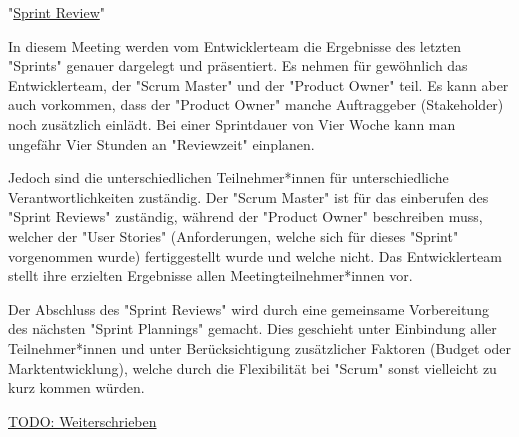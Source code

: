 "\underline{Sprint Review}"

In diesem Meeting werden vom Entwicklerteam die Ergebnisse des letzten "Sprints" genauer dargelegt und präsentiert. Es nehmen für gewöhnlich das Entwicklerteam, der "Scrum Master" und der "Product Owner" teil. Es kann aber auch vorkommen, dass der "Product Owner" manche Auftraggeber (Stakeholder) noch zusätzlich einlädt. Bei einer Sprintdauer von Vier Woche kann man ungefähr Vier Stunden an "Reviewzeit" einplanen.

Jedoch sind die unterschiedlichen Teilnehmer*innen für unterschiedliche Verantwortlichkeiten zuständig. Der "Scrum Master" ist für das einberufen des "Sprint Reviews" zuständig, während der "Product Owner" beschreiben muss, welcher der "User Stories" (Anforderungen, welche sich für dieses "Sprint" vorgenommen wurde) fertiggestellt wurde und welche nicht. Das Entwicklerteam stellt ihre erzielten Ergebnisse allen Meetingteilnehmer*innen vor.

Der Abschluss des "Sprint Reviews" wird durch eine gemeinsame Vorbereitung des nächsten "Sprint Plannings" gemacht. Dies geschieht unter Einbindung aller Teilnehmer*innen und unter Berücksichtigung zusätzlicher Faktoren (Budget oder Marktentwicklung), welche durch die Flexibilität bei "Scrum" sonst vielleicht zu kurz kommen würden. \cite{SprintReview}

\underline{TODO: Weiterschrieben}
